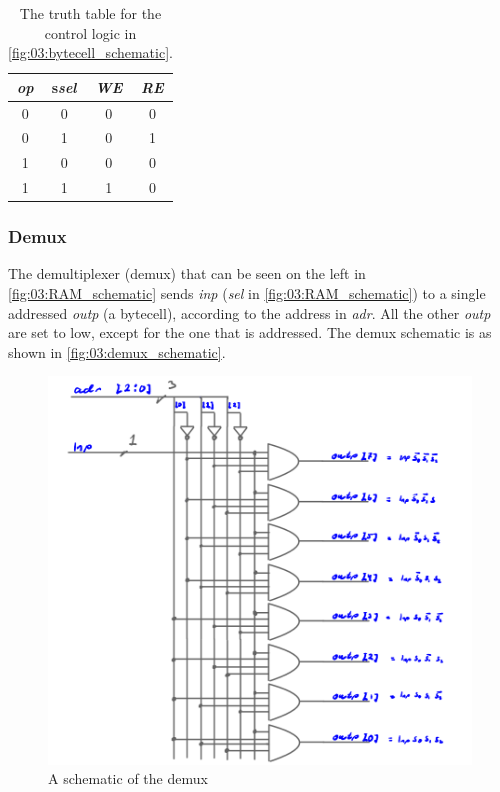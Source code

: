 \begin{table}[H]
    \centering
    \caption{The truth table for the control logic in \autoref{fig:03:bytecell_schematic}.}
    \begin{tabular}{|c|c||c|c|}
        \hline
        \textit{op}  & s\textit{sel} & \textit{WE} & \textit{RE} \\ \hline
        0   & 0   &   0         & 0           \\
        0   & 1   &   0         & 1           \\
        1   & 0   &   0         & 0           \\
        1   & 1   &   1         & 0           \\ \hline
    \end{tabular}
    \label{tab:03:F-block}
\end{table}

\subsubsection{Demux}
The demultiplexer (demux) that can be seen on the left in \autoref{fig:03:RAM_schematic} sends \textit{inp} (\textit{sel} in \autoref{fig:03:RAM_schematic}) to a single addressed \textit{outp} (a bytecell), according to the address in \textit{adr}. All the other \textit{outp} are set to low, except for the one that is addressed. The demux schematic is as shown in \autoref{fig:03:demux_schematic}.

\begin{figure}[H]
    \centering
    \includegraphics[width=0.75\linewidth]{LaTeX_2/Figures/demux1to8_schematic.png}
    \caption{A schematic of the demux}
    \label{fig:03:demux_schematic}
\end{figure}

